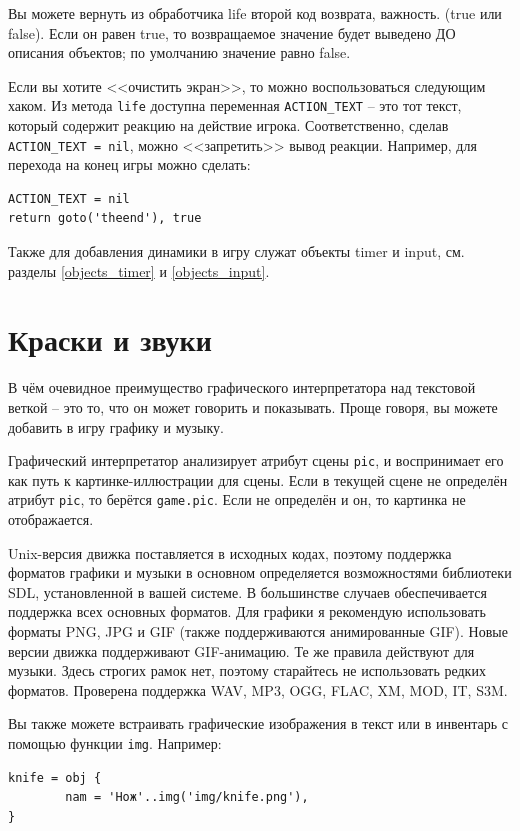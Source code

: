 \documentclass[a4paper,12pt]{article}
\begin{document}
Вы можете вернуть из обработчика life второй код возврата, важность. (true или false). Если он равен true, то возвращаемое значение будет выведено ДО описания объектов; по умолчанию значение равно false.

Если вы хотите <<очистить экран>>, то можно воспользоваться следующим хаком. Из метода \verb/life/ доступна переменная \verb/ACTION_TEXT/ -- это тот текст, который содержит реакцию на действие игрока. Соответственно, сделав \verb/ACTION_TEXT = nil/, можно <<запретить>> вывод реакции. Например, для перехода на конец игры можно сделать:

\begin{verbatim}
ACTION_TEXT = nil
return goto('theend'), true
\end{verbatim}

Также для добавления динамики в игру служат объекты timer и input, см. разделы \ref{objects_timer} и \ref{objects_input}.

\section{Краски и звуки}

В чём очевидное преимущество графического интерпретатора над текстовой веткой -- это то, что он может говорить и показывать. Проще говоря, вы можете добавить в игру графику и музыку.

Графический интерпретатор анализирует атрибут сцены \verb/pic/, и воспринимает его как путь к картинке-ил\-лю\-страции для сцены. Если в текущей сцене не определён атрибут \verb/pic/, то берётся \verb/game.pic/. Если не определён и он, то картинка не отображается.

Unix-версия движка поставляется в исходных кодах, поэтому поддержка форматов графики и музыки в основном определяется возможностями библиотеки SDL, установленной в вашей системе. В большинстве случаев обеспечивается поддержка всех основных форматов. Для графики я рекомендую использовать форматы PNG, JPG и GIF (также поддерживаются анимированные GIF). Новые версии движка поддерживают GIF-анимацию. Те же правила действуют для музыки. Здесь строгих рамок нет, поэтому старайтесь не использовать редких форматов. Проверена поддержка WAV, MP3, OGG, FLAC, XM, MOD, IT, S3M.

Вы также можете встраивать графические изображения в текст или в инвентарь с помощью функции \verb/img/. Например:

\begin{verbatim}
knife = obj {
        nam = 'Нож'..img('img/knife.png'),
}
\end{verbatim}
\end{document}
